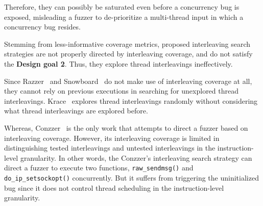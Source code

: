 Therefore, they can possibly be saturated even before a concurrency
bug is exposed, misleading a fuzzer to de-prioritize a multi-thread
input in which a concurrency bug resides.







%
Stemming from less-informative coverage metrics, proposed interleaving
search strategies are not properly directed by interleaving coverage,
and do not satisfy the \textbf{Design goal 2}. Thus, they explore
thread interleavings ineffectively.

Since Razzer~\cite{razzer} and Snowboard~\cite{snowboard} do not make
use of interleaving coverage at all, they cannot rely on previous
executions in searching for unexplored thread interleavings.
%
Krace~\cite{krace} explores thread interleavings randomly without
considering what thread interleavings are explored before.

Whereas, Conzzer~\cite{conzzer} is the only work that attempts to
direct a fuzzer based on interleaving coverage.
%
However, its interleaving coverage is limited in distinguishing tested
interleavings and untested interleavings in the instruction-level
granularity.
%
In other words, the Conzzer's interleaving search strategy can direct
a fuzzer to execute two functions, \texttt{raw_sendmsg()} and
\texttt{do_ip_setsockopt()} concurrently. But it suffers from
triggering the uninitialized bug since it does not control thread
scheduling in the instruction-level granularity.




